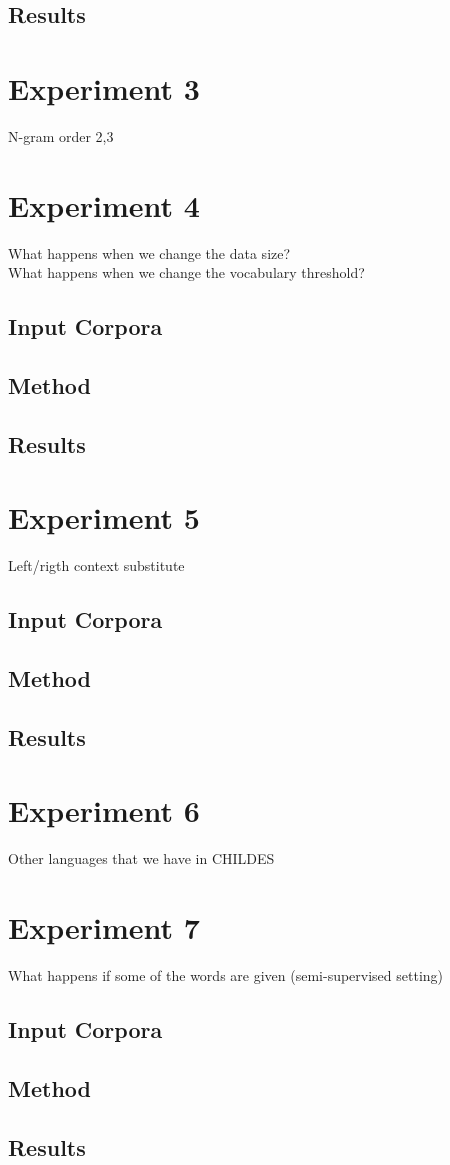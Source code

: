 \subsection{Results}

\section{Experiment 3}
N-gram order 2,3

\section{Experiment 4}
What happens when we change the data size?\\
What happens when we change the vocabulary threshold?\\

\subsection{Input Corpora}
\subsection{Method}
\subsection{Results}

\section{Experiment 5}
Left/rigth context substitute
\subsection{Input Corpora}
\subsection{Method}
\subsection{Results}

\section{Experiment 6}
Other languages that we have in CHILDES

\section{Experiment 7}
What happens if some of the words are given (semi-supervised setting)

\subsection{Input Corpora}
\subsection{Method}
\subsection{Results}



